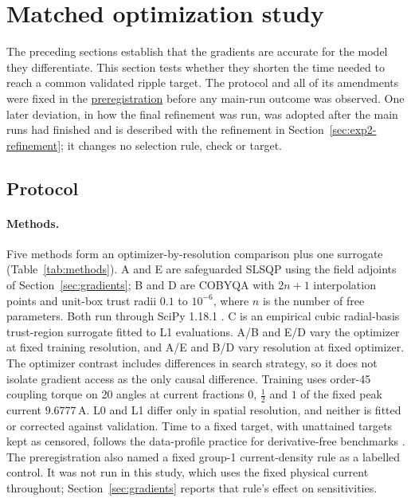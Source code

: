 \section{Matched optimization study}\label{sec:optimization}
The preceding sections establish that the gradients are accurate for the
model they differentiate. This section tests whether they shorten the time
needed to reach a common validated ripple target. The protocol and all of
its amendments were fixed in the
\href{https://github.com/rjwalters/geode-fem/issues/1185}{preregistration}
before any main-run outcome was observed. One later deviation, in how the
final refinement was run, was adopted after the main runs had finished and
is described with the refinement in Section~\ref{sec:exp2-refinement}; it
changes no selection rule, check or target.

\subsection{Protocol}
\paragraph{Methods.}
Five methods form an optimizer-by-resolution comparison plus one
surrogate (Table~\ref{tab:methods}). A and E are safeguarded SLSQP
\citep{kraft1988} using the field adjoints of Section~\ref{sec:gradients};
B and D are COBYQA \citep{ragonneau2022} with $2n+1$ interpolation points
and unit-box trust radii $0.1$ to $10^{-6}$, where $n$ is the number of free
parameters. Both run through SciPy 1.18.1 \citep{virtanen2020scipy}. C is
an empirical cubic radial-basis trust-region surrogate fitted to L1
evaluations. A/B and E/D vary the optimizer at fixed training resolution,
and A/E and B/D vary resolution at fixed optimizer. The optimizer contrast
includes differences in search strategy, so it does not isolate gradient
access as the only causal difference. Training uses order-45 coupling torque
on 20 angles at current fractions $0$, $\tfrac12$ and $1$ of the fixed peak
current $9.6777\,\mathrm{A}$. L0 and L1 differ only in spatial resolution,
and neither is fitted or corrected against validation. Time to a fixed
target, with unattained targets kept as censored, follows the data-profile
practice for derivative-free benchmarks \citep{more2009benchmarking,dolan2002benchmarking}.
The preregistration also named a fixed group-1 current-density rule as a
labelled control. It was not run in this study, which uses the fixed
physical current throughout; Section~\ref{sec:gradients} reports that
rule's effect on sensitivities.

